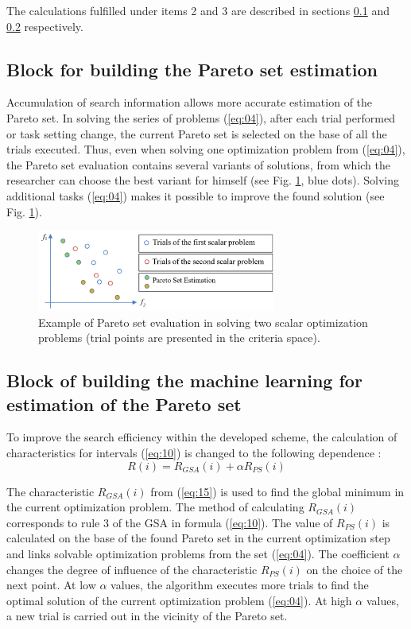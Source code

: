 \documentclass[runningheads]{llncs}
\begin{document}
The calculations fulfilled under items 2 and 3 are described in sections \ref{subsec33} and \ref{subsec34} respectively.

\subsection{Block for building the Pareto set estimation}
\label{subsec33}

Accumulation of search information allows more accurate estimation of the Pareto set. In solving the series of problems (\ref{eq:04}), after each trial performed or task setting change, the current Pareto set is selected on the base of all the trials executed. Thus, even when solving one optimization problem from (\ref{eq:04}), the Pareto set evaluation contains several variants of solutions, from which the researcher can choose the best variant for himself (see Fig. \ref{fig2}, blue dots). Solving additional tasks (\ref{eq:04}) makes it possible to improve the found solution (see Fig. \ref{fig2}).

\begin{figure}[t]
\center
\includegraphics[width=0.7\textwidth]{fig2.png}
\caption{Example of Pareto set evaluation in solving two scalar optimization problems (trial points are presented in the criteria space).} \label{fig2}
\end{figure}


\subsection{Block of  building the machine learning for estimation of the Pareto set}
\label{subsec34}

To improve the search efficiency within the developed scheme, the calculation of characteristics for intervals (\ref{eq:10}) is changed to the following dependence \cite{Konnov2025}:
\begin{equation}
    \label{eq:15}
    R(i) = R_{GSA} (i) +  \alpha R_{PS} (i)
\end{equation}

The characteristic $R_{GSA}(i)$ from (\ref{eq:15}) is used to find the global minimum in the current optimization problem. The method of calculating $R_{GSA}(i)$ corresponds to rule 3 of the GSA in formula (\ref{eq:10}). The value of $R_{PS}(i)$ is calculated on the base of the found Pareto set in the current optimization step and links solvable optimization problems from the set (\ref{eq:04}). The coefficient $\alpha$ changes the degree of influence of the characteristic  $R_{PS}(i)$ on the choice of the next point. At low $\alpha$ values, the algorithm executes more trials to find the optimal solution of the current optimization problem (\ref{eq:04}). At high $\alpha$ values, a new trial is carried out in the vicinity of the Pareto set. 
\end{document}
